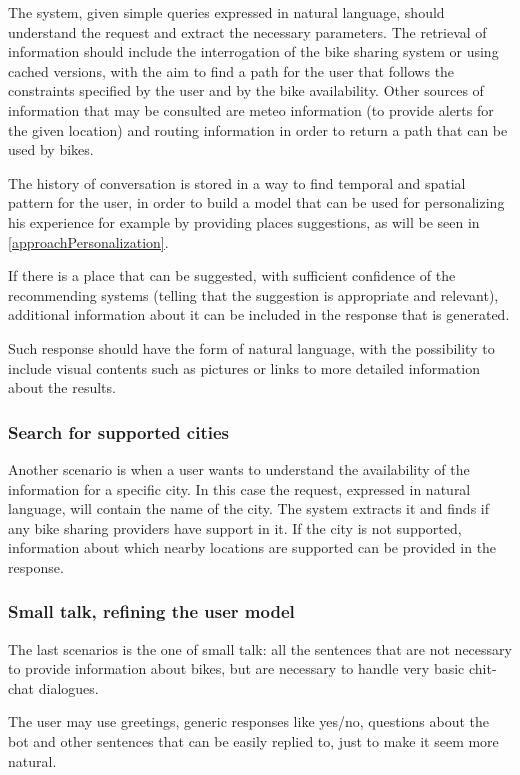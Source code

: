 The system, given simple queries expressed in natural language, should understand the request and extract the necessary parameters. The retrieval of information should include the interrogation of the bike sharing system or using cached versions, with the aim to find a path for the user that follows the constraints specified by the user and by the bike availability. Other sources of information that may be consulted are meteo information (to provide alerts for the given location) and routing information in order to return a path that can be used by bikes.

The history of conversation is stored in a way to find temporal and spatial pattern for the user, in order to build a model that can be used for personalizing his experience for example by providing places suggestions, as will be seen in \ref{approachPersonalization}.

If there is a place that can be suggested, with sufficient confidence of the recommending systems (telling that the suggestion is appropriate and relevant), additional information about it can be included in the response that is generated.

Such response should have the form of natural language, with the possibility to include visual contents such as pictures or links to more detailed information about the results.

\subsubsection{Search for supported cities}
Another scenario is when a user wants to understand the availability of the information for a specific city. In this case the request, expressed in natural language, will contain the name of the city. The system extracts it and finds if any bike sharing providers have support in it. If the city is not supported, information about which nearby locations are supported can be provided in the response.

\subsubsection{Small talk, refining the user model}
The last scenarios is the one of small talk: all the sentences that are not necessary to provide information about bikes, but are necessary to handle very basic chit-chat dialogues.

The user may use greetings, generic responses like yes/no, questions about the bot and other sentences that can be easily replied to, just to make it seem more natural.

